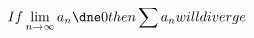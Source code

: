 \documentclass[preview]{standalone}
\begin{document}
\begin{align*}
If \lim_{n\to\infty} a_{n} \dne 0 then \sum a_{n} will diverge
\end{align*}
\end{document}
